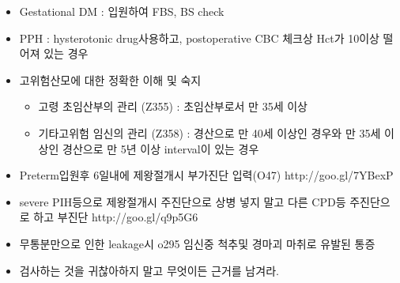 \begin{tcolorbox}[frogbox,title=기타진단 기준tip]
\begin{itemize}\tightlist
\item Gestational DM : 입원하여 FBS, BS check
\item PPH : hysterotonic drug사용하고, postoperative CBC 체크상 Hct가 10이상 떨어져 있는 경우
\item 고위험산모에 대한 정확한 이해 및 숙지
	\begin{itemize}\tightlist
	\item 고령 초임산부의 관리 (Z355) : 초임산부로서 만 35세 이상
	\item 기타고위험 임신의 관리 (Z358) : 경산으로 만 40세 이상인 경우와 만 35세 이상인 경산으로 만 5년 이상 interval이 있는 경우
	\end{itemize}
\item Preterm입원후 6일내에 제왕절개시 부가진단 입력(O47) http://goo.gl/7YBexP
\item severe PIH등으로 제왕절개시 주진단으로 상병 넣지 말고 다른 CPD등 주진단으로 하고 부진단 http://goo.gl/q9p5G6
\item 무통분만으로 인한 leakage시 o295 임신중 척추및 경마괴 마취로 유발된 통증
\item 검사하는 것을 귀찮아하지 말고 무엇이든 근거를 남겨라. 
\end{itemize}
\end{tcolorbox}
